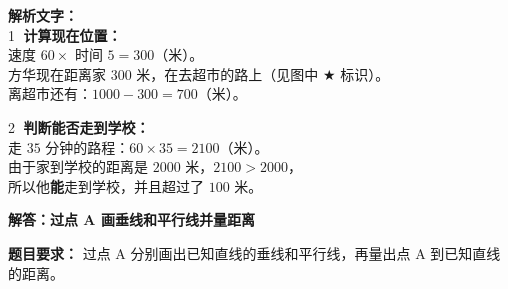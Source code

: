 {\small\color{gray}
\textbf{解析文字：}\\
\textcircled{1} \textbf{计算现在位置：}\\
速度 $60 \times$ 时间 $5 = 300$（米）。\\
方华现在距离家 $300$ 米，在去超市的路上（见图中 $\bigstar$ 标识）。\\
离超市还有：$1000 - 300 = 700$（米）。

\vspace{0.3cm}
\textcircled{2} \textbf{判断能否走到学校：}\\
走 $35$ 分钟的路程：$60 \times 35 = 2100$（米）。\\
由于家到学校的距离是 $2000$ 米，$2100 > 2000$，\\
所以他\textbf{能}走到学校，并且超过了 $100$ 米。
}




\newpage

\begin{center}
  {\large\bfseries 解答：过点 A 画垂线和平行线并量距离}
\end{center}

\vspace{0.6cm}

\noindent
{\small \textbf{题目要求：} 过点 A 分别画出已知直线的垂线和平行线，再量出点 A 到已知直线的距离。}

\vspace{0.8cm}

